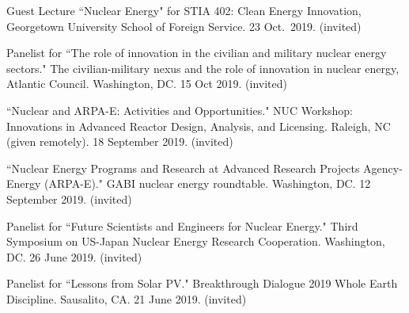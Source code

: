 \begin{bibsection}
\item Guest Lecture ``Nuclear Energy" for STIA 402: Clean Energy Innovation, Georgetown University School of Foreign Service. 23 Oct.\ 2019. (invited)

\item Panelist for ``The role of innovation in the civilian and
military nuclear energy sectors." The civilian-military nexus and the role of
innovation in nuclear energy, Atlantic Council. Washington, DC. 15 Oct 2019.
(invited)


\item ``Nuclear and ARPA-E: Activities and Opportunities." NUC
Workshop: Innovations in Advanced Reactor Design, Analysis, and Licensing.
Raleigh, NC (given remotely). 18 September 2019. (invited)

\item ``Nuclear Energy Programs and Research at Advanced
Research Projects Agency-Energy (ARPA-E)." GABI nuclear energy roundtable.
Washington, DC. 12 September 2019. (invited)



\item Panelist for ``Future Scientists and Engineers for Nuclear Energy." Third Symposium on US-Japan Nuclear Energy Research Cooperation. Washington, DC. 26 June 2019. (invited)

\item Panelist for ``Lessons from Solar PV." Breakthrough Dialogue 2019 Whole Earth Discipline. Sausalito, CA. 21 June 2019. (invited)





\end{bibsection}
